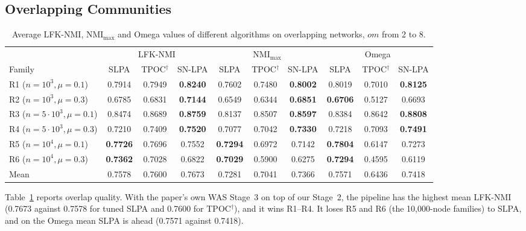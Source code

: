 \documentclass[conference]{IEEEtran}
\begin{document}
\subsection{Overlapping Communities}
\begin{table}[t]
\centering
\caption{Average LFK-NMI, $\mathrm{NMI}_{\max}$ and Omega values of different algorithms on overlapping networks, $om$ from 2 to 8.}
\label{tab:ov}
\scriptsize
\begin{tabular}{lccc|ccc|ccc}
\toprule
 & \multicolumn{3}{c|}{LFK-NMI} & \multicolumn{3}{c|}{$\mathrm{NMI}_{\max}$} & \multicolumn{3}{c}{Omega} \\
Family & SLPA & TPOC$^{\dagger}$ & SN-LPA & SLPA & TPOC$^{\dagger}$ & SN-LPA & SLPA & TPOC$^{\dagger}$ & SN-LPA \\
\midrule
R1 ($n{=}10^3,\mu{=}0.1$) & 0.7914 & 0.7949 & \textbf{0.8240} & 0.7602 & 0.7480 & \textbf{0.8002} & 0.8019 & 0.7010 & \textbf{0.8125} \\
R2 ($n{=}10^3,\mu{=}0.3$) & 0.6785 & 0.6831 & \textbf{0.7144} & 0.6549 & 0.6344 & \textbf{0.6851} & \textbf{0.6706} & 0.5127 & 0.6693 \\
R3 ($n{=}5{\cdot}10^3,\mu{=}0.1$) & 0.8474 & 0.8689 & \textbf{0.8759} & 0.8137 & 0.8507 & \textbf{0.8597} & 0.8384 & 0.8642 & \textbf{0.8808} \\
R4 ($n{=}5{\cdot}10^3,\mu{=}0.3$) & 0.7210 & 0.7409 & \textbf{0.7520} & 0.7077 & 0.7042 & \textbf{0.7330} & 0.7218 & 0.7093 & \textbf{0.7491} \\
R5 ($n{=}10^4,\mu{=}0.1$) & \textbf{0.7726} & 0.7696 & 0.7552 & \textbf{0.7294} & 0.6972 & 0.7142 & \textbf{0.7804} & 0.6147 & 0.7273 \\
R6 ($n{=}10^4,\mu{=}0.3$) & \textbf{0.7362} & 0.7028 & 0.6822 & \textbf{0.7029} & 0.5900 & 0.6275 & \textbf{0.7294} & 0.4595 & 0.6119 \\
\midrule
Mean & 0.7578 & 0.7600 & 0.7673 & 0.7281 & 0.7041 & 0.7366 & 0.7571 & 0.6436 & 0.7418 \\
\bottomrule
\end{tabular}
\end{table}
Table~\ref{tab:ov} reports overlap quality. With the paper's own WAS Stage~3 on top of our Stage~2, the pipeline has the highest mean LFK-NMI (0.7673 against 0.7578 for tuned SLPA and 0.7600 for TPOC$^{\dagger}$), and it wins R1--R4. It loses R5 and R6 (the 10{,}000-node families) to SLPA, and on the Omega mean SLPA is ahead (0.7571 against 0.7418).
\end{document}

